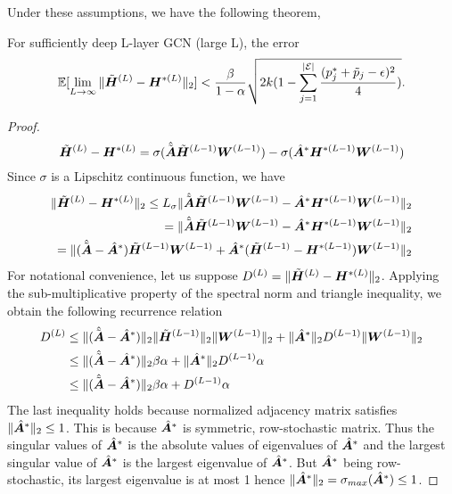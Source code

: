 Under these assumptions, we have the following theorem,
\begin{theorem}
For sufficiently deep L-layer GCN (large L), the error 
{
\[
\mathbb{E}[\lim_{L \to \infty} \| {\tilde{{\bm{H}}}}^{(L)} - {\bm{H}}^{*(L)} \|_{2}] < \frac{\beta}{1-\alpha}\sqrt{2k (1 - \sum_{j=1}^{|\mathcal{E}|} \frac{(p^*_j + \tilde{p}_j - \epsilon)^2}{4})}.
\]
}
\end{theorem}
\begin{proof}
{
\[
{\tilde{{\bm{H}}}}^{(L)} - {\bm{H}}^{*(L)} = \sigma(\hat{{\tilde{{\bm{A}}}}}{\tilde{{\bm{H}}}}^{(L-1)}{\bm{W}}^{(L-1)}) - \sigma(\hat{{\bm{A}}}^*{\bm{H}}^{*(L-1)}{\bm{W}}^{(L-1)})
\]
}
Since $\sigma$ is a Lipschitz continuous function, we have
{
\begin{align*}
\| {\tilde{{\bm{H}}}}^{(L)} - {\bm{H}}^{*(L)} \|_{2} \leq L_\sigma\| \hat{{\tilde{{\bm{A}}}}}{\tilde{{\bm{H}}}}^{(L-1)}{\bm{W}}^{(L-1)} - \hat{{\bm{A}}}^*{\bm{H}}^{*(L-1)}{\bm{W}}^{(L-1)} \|_{2} \\
= \| \hat{{\tilde{{\bm{A}}}}}{\tilde{{\bm{H}}}}^{(L-1)}{\bm{W}}^{(L-1)} - \hat{{\bm{A}}}^*{\bm{H}}^{*(L-1)}{\bm{W}}^{(L-1)} \|_{2}\\
= \| (\hat{{\tilde{{\bm{A}}}}} -\hat{{\bm{A}}}^*) {\tilde{{\bm{H}}}}^{(L-1)}{\bm{W}}^{(L-1)} + \hat{{\bm{A}}}^*({\tilde{{\bm{H}}}}^{(L-1)}- {\bm{H}}^{*(L-1)}){\bm{W}}^{(L-1)} \|_{2}
\end{align*}
}
For notational convenience, let us suppose $D^{(L)} = \| {\tilde{{\bm{H}}}}^{(L)} - {\bm{H}}^{*(L)} \|_{2}$. Applying the sub-multiplicative property of the spectral norm and triangle inequality, we obtain the following recurrence relation
{
\begin{align*}
    D^{(L)} &\leq \| (\hat{{\tilde{{\bm{A}}}}} -\hat{{\bm{A}}}^*) \|_{2}\| {\tilde{{\bm{H}}}}^{(L-1)} \|_{2}\| {\bm{W}}^{(L-1)} \|_{2} +   \| \hat{{\bm{A}}}^* \|_{2}D^{(L-1)}\| {\bm{W}}^{(L-1)} \|_{2} \\
    &\leq \| (\hat{{\tilde{{\bm{A}}}}} -\hat{{\bm{A}}}^*) \|_{2} \beta\alpha + \| \hat{{\bm{A}}}^* \|_{2}D^{(L-1)}\alpha \\
    &\leq \| (\hat{{\tilde{{\bm{A}}}}} -\hat{{\bm{A}}}^*) \|_{2} \beta\alpha + D^{(L-1)}\alpha 
\end{align*}
}
The last inequality holds because normalized adjacency matrix satisfies $\| \hat{{\bm{A}}}^* \|_{2} \leq 1$. This is because $\hat{{\bm{A}}}^*$ is symmetric, row-stochastic matrix. Thus the singular values of $\hat{{\bm{A}}}^*$ is the absolute values of eigenvalues of $\hat{{\bm{A}}}^*$ and the largest singular value of $\hat{{\bm{A}}}^*$ is the largest eigenvalue of $\hat{{\bm{A}}}^*$. But $\hat{{\bm{A}}}^*$ being row-stochastic, its largest eigenvalue is at most 1 hence $\| \hat{{\bm{A}}}^* \|_{2} = \sigma_{max}(\hat{{\bm{A}}}^*) \leq 1$.


\end{proof}
